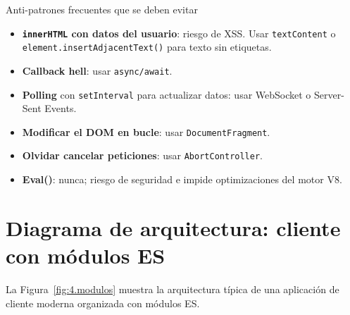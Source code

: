 \documentclass[11pt,a4paper,openany]{book}
\begin{document}
	\begin{cajaadvertencia}{Anti-patrones frecuentes que se deben evitar}
		\begin{itemize}
			\item \textbf{\texttt{innerHTML} con datos del usuario}: riesgo
			de XSS. Usar \texttt{textContent} o
			\texttt{element.insertAdjacentText()} para texto sin
			etiquetas.
			\item \textbf{Callback hell}: usar \texttt{async/await}.
			\item \textbf{Polling} con \texttt{setInterval} para actualizar
			datos: usar WebSocket o Server-Sent Events.
			\item \textbf{Modificar el DOM en bucle}: usar
			\texttt{DocumentFragment}.
			\item \textbf{Olvidar cancelar peticiones}: usar
			\texttt{AbortController}.
			\item \textbf{Eval()}: nunca; riesgo de seguridad e impide
			optimizaciones del motor V8.
		\end{itemize}
	\end{cajaadvertencia}
	
	\section{Diagrama de arquitectura: cliente con módulos ES}
	\label{sec:4.arquitectura}
	
	La Figura~\ref{fig:4.modulos} muestra la arquitectura típica
	de una aplicación de cliente moderna organizada con módulos ES.
	
\end{document}
